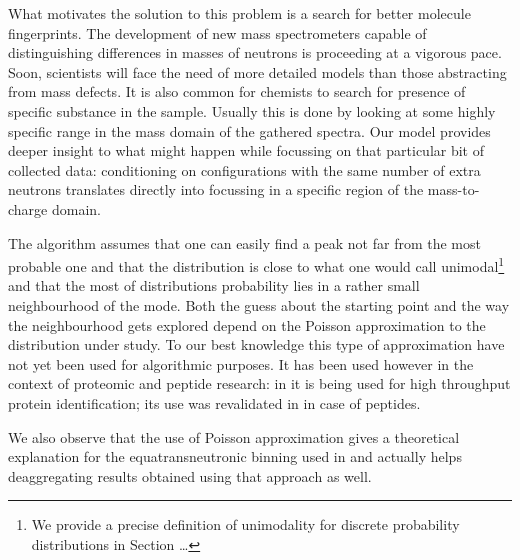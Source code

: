 What motivates the solution to this problem is a search for better molecule fingerprints. The development of new mass spectrometers capable of distinguishing differences in masses of neutrons is proceeding at a vigorous pace. Soon, scientists will face the need of more detailed models than those abstracting from mass defects. It is also common for chemists to search for presence of specific substance in the sample. Usually this is done by looking at some highly specific range in the mass domain of the gathered spectra. Our model provides deeper insight to what might happen while focussing on that particular bit of collected data: conditioning on configurations with the same number of extra neutrons translates directly into focussing in a specific region of the mass-to-charge domain.


The algorithm assumes that one can easily find a peak not far from the most probable one and that the distribution is close to what one would call unimodal\footnote{We provide a precise definition of unimodality for discrete probability distributions in Section \dots} and that the most of distributions probability lies in a rather small neighbourhood of the mode. Both the guess about the starting point and the way the neighbourhood gets explored depend on the Poisson approximation to the distribution under study. To our best knowledge this type of approximation have not yet been used for algorithmic purposes. It has been used however in the context of proteomic and peptide research: in \cite{Breen2000AutomaticPeak} it is being used for high throughput protein identification; its use was revalidated in \cite{Valkenborg2007UsingPoisson} in case of peptides.


We also observe that the use of Poisson approximation gives a theoretical explanation for the equatransneutronic binning used in \cite{Olson2009Calculations} and actually helps deaggregating results obtained using that approach as well.






